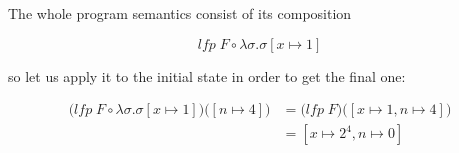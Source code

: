 \documentclass{article}
\begin{document}
\begin{enumerate}[(a)]
    The whole program semantics consist of its composition

    $$
      lfp \; F \circ \lambda\sigma.\sigma
      \left[
        x \mapsto 1
      \right]
    $$

    so let us apply it to the initial state in order to get the 
    final one: 

    \begin{align*}
      \big(lfp \; F \circ \lambda\sigma.\sigma
      \left[
        x \mapsto 1
      \right]\big)\big([n \mapsto 4]\big) &= 
      \big(lfp \; F\big)\big([
        x \mapsto 1,
        n \mapsto 4
      ]\big) \\
      &= [
        x \mapsto 2^4,
        n \mapsto 0
      ]
    \end{align*}
\end{enumerate}
\end{document}
